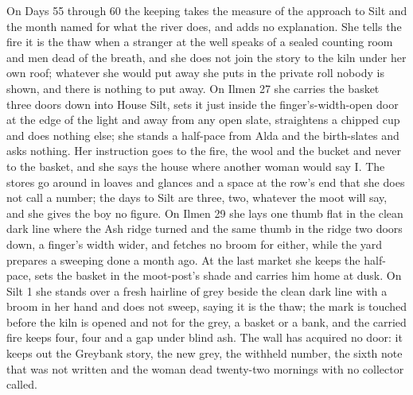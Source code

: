 \documentclass{design/chronicle}
\begin{document}
{On Days 55 through 60 the keeping takes the measure of the approach to Silt and the month named for what the river does, and adds no explanation. She tells the fire it is the thaw when a stranger at the well speaks of a sealed counting room and men dead of the breath, and she does not join the story to the kiln under her own roof; whatever she would put away she puts in the private roll nobody is shown, and there is nothing to put away. On Ilmen 27 she carries the basket three doors down into House Silt, sets it just inside the finger’s-width-open door at the edge of the light and away from any open slate, straightens a chipped cup and does nothing else; she stands a half-pace from Alda and the birth-slates and asks nothing. Her instruction goes to the fire, the wool and the bucket and never to the basket, and she says the house where another woman would say I. The stores go around in loaves and glances and a space at the row’s end that she does not call a number; the days to Silt are three, two, whatever the moot will say, and she gives the boy no figure. On Ilmen 29 she lays one thumb flat in the clean dark line where the Ash ridge turned and the same thumb in the ridge two doors down, a finger’s width wider, and fetches no broom for either, while the yard prepares a sweeping done a month ago. At the last market she keeps the half-pace, sets the basket in the moot-post’s shade and carries him home at dusk. On Silt 1 she stands over a fresh hairline of grey beside the clean dark line with a broom in her hand and does not sweep, saying it is the thaw; the mark is touched before the kiln is opened and not for the grey, a basket or a bank, and the carried fire keeps four, four and a gap under blind ash. The wall has acquired no door: it keeps out the Greybank story, the new grey, the withheld number, the sixth note that was not written and the woman dead twenty-two mornings with no collector called.

}
\end{document}

